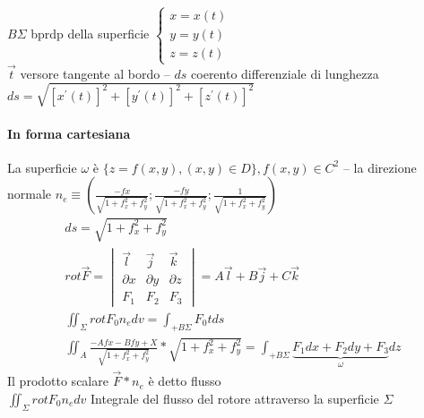 $B\Sigma$ bprdp della superficie $\begin{cases}
                                    x=x(t)\\
                                    y=y(t)\\
                                    z=z(t)
                                  \end{cases}$\\
$\vec{t}$ versore tangente al bordo -- $ds$ coerento differenziale di lunghezza $ds=\sqrt{[x^\prime(t)]^2+[y^\prime(t)]^2+[z^\prime(t)]^2}$
\paragraph{In forma cartesiana} La superficie $\omega$ è $\{z=f(x,y), (x,y)\in D\}, f(x,y)\in C^2$ -- la direzione normale $n_e\equiv \left(\frac{-fx}{\sqrt{1+f_x^2+f_y^2}};
  \frac{-fy}{\sqrt{1+f_x^2+f_y^2}}; \frac{1}{\sqrt{1+f_x^2+f_y^2}}\right)$ 
\begin{eqnarray*}
  ds=\sqrt{1+f_x^2+f_y^2}\\
  rot \vec{F}=\begin{vmatrix}
                \vec{l} & \vec{j} & \vec{k} \\
                \partial x & \partial y & \partial z \\
                F_1 & F_2 & F_3
              \end{vmatrix} = A \vec{l} + B\vec{j} + C\vec{k}\\
  \iint_\Sigma rot F_0 n_e dv=\int_{+B\Sigma} F_0 tds\\
  \iint_A\frac{-Afx-Bfy+X}{\sqrt{1+f_x^2+f_y^2}}*\sqrt{1+f_x^2+f_y^2}=\int_{+B\Sigma}
  \underbrace{F_1dx+F_2dy+F_3}_\omega dz
\end{eqnarray*}
Il prodotto scalare $\vec{F}*n_e$ è detto {\color{red}flusso}\\
$\iint_\Sigma rot F_0 n_e dv$ Integrale del flusso del rotore attraverso la superficie
$\Sigma$
